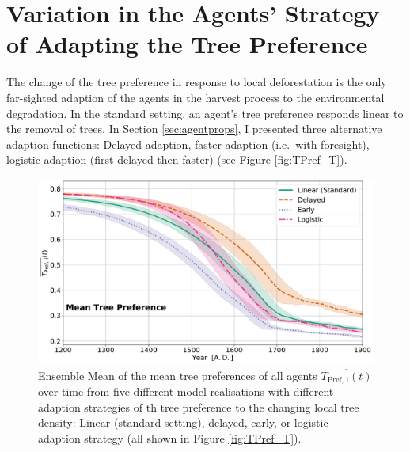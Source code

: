 \section{Variation in the Agents' Strategy of Adapting the Tree Preference}

The change of the tree preference in response to local deforestation is the only far-sighted adaption of the agents in the harvest process to the environmental degradation.
In the standard setting, an agent's tree preference responds linear to the removal of trees.
In Section \ref{sec:agentprops}, I presented three alternative adaption functions: Delayed adaption, faster adaption (i.e.\ with foresight), logistic adaption (first delayed then faster) (see Figure \ref{fig:TPref_T}).
\begin{figure}
	\centering
	\includegraphics[width=1\linewidth]{images/Results/TPref/TPrefAdaption_TPref}
	\caption{Ensemble Mean of the mean tree preferences of all agents $\overline{T_\text{Pref, i}(t)}$ over time from five different model realisations with different adaption strategies of th tree preference to the changing local tree density: Linear (standard setting), delayed, early, or logistic adaption strategy (all shown in Figure \ref{fig:TPref_T}).}
	\label{fig:tprefadaptiontpref}
\end{figure}
